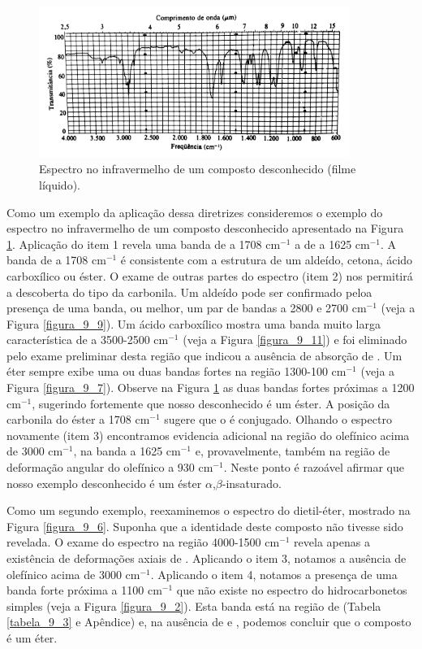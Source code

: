 \begin{figure}[H]
    \centering
    \includegraphics[width=0.9\textwidth,angle=0]{content/images/Figura_9_8.pdf}
    \caption{Espectro no infravermelho de um composto desconhecido (filme líquido).}
    \label{figura_9_8}
\end{figure}

Como um exemplo da aplicação dessa diretrizes consideremos o exemplo do espectro no infravermelho de um composto desconhecido apresentado na Figura \ref{figura_9_8}. Aplicação do item 1 revela uma banda de  a 1708 cm$^{-1}$ a de  a 1625 cm$^{-1}$. A banda de  a 1708 cm$^{-1}$ é consistente  com a estrutura de um aldeído, cetona, ácido carboxílico ou éster. O exame de outras partes do espectro (item 2) nos permitirá a descoberta do tipo da carbonila. Um aldeído pode ser confirmado peloa presença de uma banda, ou melhor, um par de bandas a 2800 e 2700 cm$^{-1}$ (veja a Figura \ref{figura_9_9}). Um ácido carboxílico mostra uma banda muito larga característica de  a 3500-2500 cm$^{-1}$ (veja a Figura \ref{figura_9_11}) e foi eliminado pelo exame preliminar desta região que indicou a ausência de absorção de . Um éter sempre exibe uma ou duas bandas fortes na região 1300-100 cm$^{-1}$ (veja a Figura \ref{figura_9_7}). Observe na Figura \ref{figura_9_8} as duas bandas fortes próximas a 1200 cm$^{-1}$, sugerindo fortemente que nosso desconhecido é um éster. A posição da carbonila do éster a 1708 cm$^{-1}$ sugere que o  é conjugado. Olhando o espectro novamente (item 3) encontramos evidencia adicional na região do  olefínico acima de 3000 cm$^{-1}$, na banda  a 1625 cm$^{-1}$ e, provavelmente, também na região de deformação angular do  olefínico a 930 cm$^{-1}$. Neste ponto é razoável afirmar que nosso exemplo desconhecido é um éster $\alpha$,$\beta$-insaturado.

Como um segundo exemplo, reexaminemos o espectro do dietil-éter, mostrado na Figura \ref{figura_9_6}. Suponha que a identidade deste composto não tivesse sido revelada. O exame do espectro na região 4000-1500 cm$^{-1}$ revela apenas a existência de deformações axiais de . Aplicando o item 3, notamos a ausência de  olefínico acima de 3000 cm$^{-1}$. Aplicando o item 4, notamos a presença de uma banda forte próxima a 1100 cm$^{-1}$ que não existe no espectro do hidrocarbonetos simples (veja a Figura \ref{figura_9_2}). Esta banda está na região de  (Tabela \ref{tabela_9_3} e Apêndice) e, na ausência de  e , podemos concluir que o composto é um éter.

